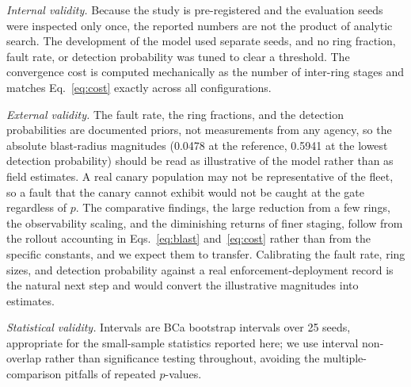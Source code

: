 \documentclass[journal]{IEEEtran}
\begin{document}
\emph{Internal validity.} Because the study is pre-registered and the evaluation seeds were inspected
only once, the reported numbers are not the product of analytic search. The development of the model
used separate seeds, and no ring fraction, fault rate, or detection probability was tuned to clear a
threshold. The convergence cost is computed mechanically as the number of inter-ring stages and
matches Eq.~\eqref{eq:cost} exactly across all configurations.

\emph{External validity.} The fault rate, the ring fractions, and the detection probabilities are
documented priors, not measurements from any agency, so the absolute blast-radius magnitudes (0.0478
at the reference, 0.5941 at the lowest detection probability) should be read as illustrative of the
model rather than as field estimates. A real canary population may not be representative of the
fleet, so a fault that the canary cannot exhibit would not be caught at the gate regardless of $p$.
The comparative findings, the large reduction from a few rings, the observability scaling, and the
diminishing returns of finer staging, follow from the rollout accounting in
Eqs.~\eqref{eq:blast} and~\eqref{eq:cost} rather than from the specific constants, and we expect them
to transfer. Calibrating the fault rate, ring sizes, and detection probability against a real
enforcement-deployment record is the natural next step and would convert the illustrative magnitudes
into estimates.

\emph{Statistical validity.} Intervals are BCa bootstrap intervals over 25 seeds, appropriate for the
small-sample statistics reported here; we use interval non-overlap rather than significance testing
throughout, avoiding the multiple-comparison pitfalls of repeated $p$-values.
\end{document}
